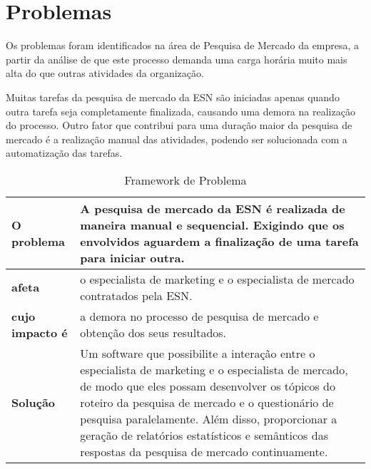 \section{Problemas}

	Os problemas foram identificados na área de Pesquisa de Mercado da empresa, a partir da análise de que este processo demanda uma carga horária muito mais alta do que outras atividades da organização.

	Muitas tarefas da pesquisa de mercado da ESN são iniciadas apenas quando outra tarefa seja completamente finalizada, causando uma demora na realização do processo. Outro fator que contribui para uma duração maior da pesquisa de mercado é a realização manual das atividades, podendo ser solucionada com a automatização das tarefas.

	\vspace*{0.5cm}

	\begin{table}[htbp]
		\caption{Framework de Problema}
		\begin{tabular}{|l|p{13cm}|}
			\hline
			\textbf{O problema} & A pesquisa de mercado da ESN é realizada de maneira manual e sequencial. Exigindo que os envolvidos aguardem a finalização de uma tarefa para iniciar outra. \\ \hline

			\textbf{afeta} & o especialista de marketing e o especialista de mercado contratados pela ESN. \\ \hline

			\textbf{cujo impacto é} & a demora no processo de pesquisa de mercado e obtenção dos seus resultados. \\ \hline

			\textbf{Solução} & Um software que possibilite a interação entre o especialista de marketing e o especialista de mercado, de modo que eles possam desenvolver os tópicos do roteiro da pesquisa de mercado e o questionário de pesquisa paralelamente. Além disso, proporcionar a geração de relatórios estatísticos e semânticos das respostas da pesquisa de mercado continuamente. \\ \hline
		\end{tabular}
	\label{Framework de Problema}
	\end{table}